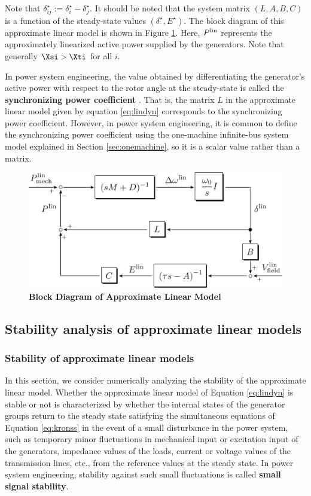 \documentclass[graybox, envcountchap]{svmult}
\begin{document}
Note that $\delta_{ij}^{\star}:=\delta_{i}^{\star}-\delta_{j}^{\star}$. It
should be noted that the system matrix $(L,A,B,C)$ is a function of the
steady-state values $(\delta^{\star},E^{\star})$. The block diagram of this
approximate linear model is shown in Figure \ref{fig:blocklinsys}. Here, $P^{\rm
lin}$ represents the approximately linearized active power supplied by the
generators. Note that generally $\Xsi > \Xti$ for all $i$.

In power system engineering, the value obtained by differentiating the
generator's active power with respect to the rotor angle at the steady-state is
called the \textbf{synchronizing power coefficient} \cite[Section 8.4]{kato2017electric}. That is, the matrix $L$ in
the approximate linear model given by equation \ref{eq:lindyn} corresponds to
the synchronizing power coefficient. However, in power system engineering, it is
common to define the synchronizing power coefficient using the one-machine
infinite-bus system model explained in Section \ref{sec:onemachine}, so it is a
scalar value rather than a matrix.

\begin{figure}[t]
  \centering
  \includegraphics[width = .8\linewidth]{figs/blocklinsys3}
  \medskip
  \caption{\textbf{Block Diagram of Approximate Linear Model}}
  \label{fig:blocklinsys}
  \medskip
\end{figure}

\subsection{Stability analysis of approximate linear models}


\smallskip
\subsubsection{Stability of approximate linear models}

In this section, we consider numerically analyzing the stability of the
approximate linear model. Whether the approximate linear model of Equation
\ref{eq:lindyn} is stable or not is characterized by whether the internal states
of the generator groups return to the steady state satisfying the simultaneous
equations of Equation \ref{eq:kronss} in the event of a small disturbance in the
power system, such as temporary minor fluctuations in mechanical input or
excitation input of the generators, impedance values of the loads, current or
voltage values of the transmission lines, etc., from the reference values at the
steady state. In power system engineering, stability against such small
fluctuations is called \textbf{small signal stability}.
\end{document}
